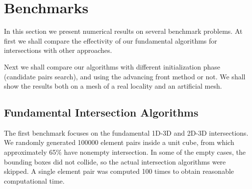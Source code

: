 \documentclass{elsarticle}
\begin{document}
% 





\section{Benchmarks}
In this section we present numerical results on several benchmark problems. At first we shall compare 
the effectivity of our fundamental algorithms for intersections with other approaches.

Next we shall compare our algorithms with different initialization phase (candidate pairs search),
and using the advancing front method or not. We shall show the results both on a mesh of a real locality
and an artificial mesh.

\subsection{Fundamental Intersection Algorithms}
The first benchmark focuses on the fundamental 1D-3D and 2D-3D intersections. We randomly generated
100000 element pairs inside a unit cube, from which approximately 65\% have nonempty intersection.
In some of the empty cases, the bounding boxes did not collide, so the actual intersection algorithms were skipped. A single element pair was computed 100 times to obtain reasonable computational time.
\end{document}
